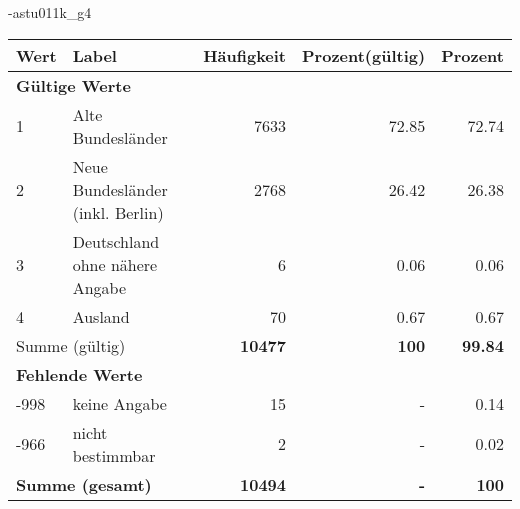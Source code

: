                 \vspace*{-\baselineskip}
					\begin{filecontents}{\jobname-astu011k_g4}
					\begin{longtable}{lXrrr}
					\toprule
					\textbf{Wert} & \textbf{Label} & \textbf{Häufigkeit} & \textbf{Prozent(gültig)} & \textbf{Prozent} \\
					\endhead
					\midrule
					\multicolumn{5}{l}{\textbf{Gültige Werte}}\\

					1 &
					\multicolumn{1}{X}{ Alte Bundesländer   } &


					  \num{7633} &
					  \num[round-mode=places,round-precision=2]{72,85} &
					    \num[round-mode=places,round-precision=2]{72,74} \\

					2 &
					\multicolumn{1}{X}{ Neue Bundesländer (inkl. Berlin)   } &


					  \num{2768} &
					  \num[round-mode=places,round-precision=2]{26,42} &
					    \num[round-mode=places,round-precision=2]{26,38} \\

					3 &
					\multicolumn{1}{X}{ Deutschland ohne nähere Angabe   } &


					  \num{6} &
					  \num[round-mode=places,round-precision=2]{0,06} &
					    \num[round-mode=places,round-precision=2]{0,06} \\

					4 &
					\multicolumn{1}{X}{ Ausland   } &


					  \num{70} &
					  \num[round-mode=places,round-precision=2]{0,67} &
					    \num[round-mode=places,round-precision=2]{0,67} \\
					\midrule
					\multicolumn{2}{l}{Summe (gültig)} &
					  \textbf{\num{10477}} &
					\textbf{100} &
					  \textbf{\num[round-mode=places,round-precision=2]{99,84}} \\
					\multicolumn{5}{l}{\textbf{Fehlende Werte}}\\
							-998 &
							keine Angabe &
							  \num{15} &
							 - &
							  \num[round-mode=places,round-precision=2]{0,14} \\
							-966 &
							nicht bestimmbar &
							  \num{2} &
							 - &
							  \num[round-mode=places,round-precision=2]{0,02} \\
					\midrule
					\multicolumn{2}{l}{\textbf{Summe (gesamt)}} &
				      \textbf{\num{10494}} &
				    \textbf{-} &
				    \textbf{100} \\
					\bottomrule
					\end{longtable}
					\end{filecontents}
